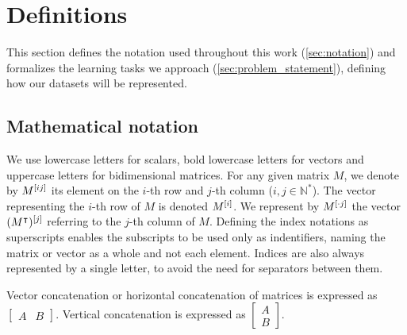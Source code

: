 
\section{Definitions}
\label{sec:definitions}

This section defines the notation used throughout this work (\autoref{sec:notation}) and formalizes the learning tasks we approach (\autoref{sec:problem_statement}), defining how our datasets will be represented.

\subsection{Mathematical notation}
\label{sec:notation}


We use lowercase letters for scalars, bold lowercase letters for vectors and uppercase letters for bidimensional matrices.
For any given matrix $M$, we denote by $M^{[ij]}$ its element on the $i$-th row
and $j$-th column ($i, j \in \mathbb{N}^*$).
The vector representing the $i$-th row of $M$ is denoted $M^{[i]}$.
We represent by $M^{[\cdot j]}$ the vector $(M^\intercal)^{[j]}$ referring to the $j$-th column of $M$. 
Defining the index notations as superscripts enables the subscripts to be used only as indentifiers, naming the matrix or vector as a whole and not each element. Indices are also
always represented by a single letter, to avoid the need for separators between
them.

Vector concatenation or horizontal concatenation of matrices is expressed as 
$\begin{bmatrix}A & B\end{bmatrix}$.
Vertical concatenation is expressed as $\begin{bmatrix}A \\ B\end{bmatrix}$.

